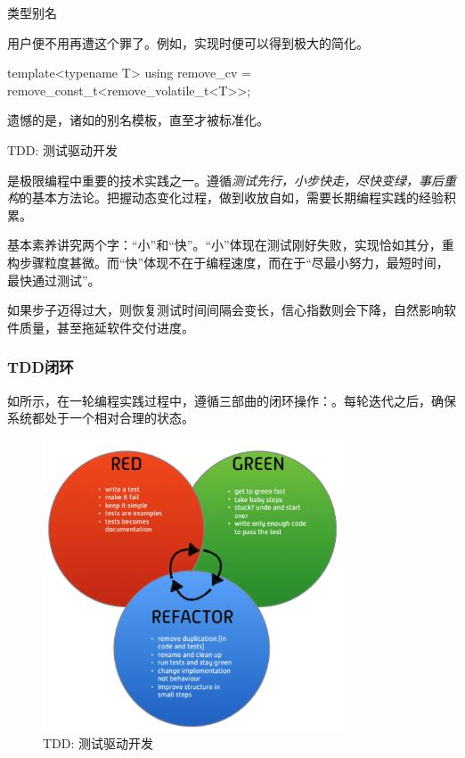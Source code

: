 \begin{content}
\begin{episode}{类型别名}
\begin{content}
用户便不用再遭这个罪了。例如，实现时便可以得到极大的简化。

\begin{c++}[title={\ttfamily{改善remove\_cv： 复用实现}}]
template<typename T>
using remove_cv = remove_const_t<remove_volatile_t<T>>;
\end{c++}

遗憾的是，诸如的别名模板，直至才被标准化。

\end{content}
\end{episode}

\begin{episode}{TDD: 测试驱动开发}
\begin{content}

是极限编程中重要的技术实践之一。遵循\emph{测试先行，小步快走，尽快变绿，事后重构}的基本方法论。把握动态变化过程，做到收放自如，需要长期编程实践的经验积累。

基本素养讲究两个字：“小”和“快”。“小”体现在测试刚好失败，实现恰如其分，重构步骤粒度甚微。而“快”体现不在于编程速度，而在于“尽最小努力，最短时间，最快通过测试”。

如果步子迈得过大，则恢复测试时间间隔会变长，信心指数则会下降，自然影响软件质量，甚至拖延软件交付进度。

\subsubsection{TDD闭环}

如所示，在一轮编程实践过程中，遵循三部曲的闭环操作：。每轮迭代之后，确保系统都处于一个相对合理的状态。

\begin{figure}[H]
\centering
\includegraphics[width=0.8\textwidth]{figures/xunit/tdd-cycle.png}
\caption{TDD: 测试驱动开发}
 \label{fig:tdd-cycle}
\end{figure}


\end{content}
\end{episode}
\end{content}
